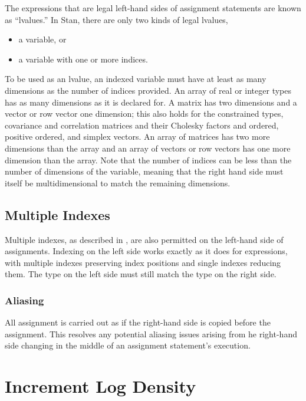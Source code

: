 The expressions that are legal left-hand sides of assignment
statements are known as ``lvalues.''  In Stan, there are only two
kinds of legal lvalues,
%
\begin{itemize}
\item a variable, or
\item a variable with one or more indices.
\end{itemize}
%
To be used as an lvalue, an indexed variable must have at least as
many dimensions as the number of indices provided.  An array of real
or integer types has as many dimensions as it is declared for.  A
matrix has two dimensions and a vector or row vector one dimension;
this also holds for the constrained types, covariance and correlation
matrices and their Cholesky factors and ordered, positive ordered, and
simplex vectors.  An array of matrices has two more dimensions than
the array and an array of vectors or row vectors has one more
dimension than the array.  Note that the number of indices can be less
than the number of dimensions of the variable, meaning that the right
hand side must itself be multidimensional to match the remaining
dimensions.

\subsection{Multiple Indexes}

Multiple indexes, as described in
, are also permitted on the
left-hand side of assignments.  Indexing on the left side works
exactly as it does for expressions, with multiple indexes preserving
index positions and single indexes reducing them.    The type on the
left side must still match the type on the right side.

\subsubsection{Aliasing}

All assignment is carried out as if the right-hand side is copied
before the assignment.  This resolves any potential aliasing issues
arising from he right-hand side changing in the middle of an
assignment statement's execution.



\section{Increment Log Density}\label{increment-log-prob.section}

